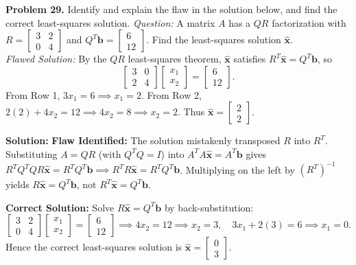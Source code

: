 \documentclass[11pt, letterpaper]{article}
\theoremstyle{definition}
\theoremstyle{remark}
\begin{document}
\textbf{Problem 29.} Identify and explain the flaw in the solution below, and find the correct least-squares solution.
\textit{Question:} A matrix $A$ has a $QR$ factorization with $R = \begin{bmatrix} 3 & 2 \\ 0 & 4 \end{bmatrix}$ and $Q^T \mathbf{b} = \begin{bmatrix} 6 \\ 12 \end{bmatrix}$. Find the least-squares solution $\hat{\mathbf{x}}$.\\
\textit{Flawed Solution:} By the $QR$ least-squares theorem, $\hat{\mathbf{x}}$ satisfies $R^T \hat{\mathbf{x}} = Q^T \mathbf{b}$, so
\[
\begin{bmatrix} 3 & 0 \\ 2 & 4 \end{bmatrix} \begin{bmatrix} x_1 \\ x_2 \end{bmatrix} = \begin{bmatrix} 6 \\ 12 \end{bmatrix}.
\]
From Row 1, $3x_1 = 6 \implies x_1 = 2$. From Row 2, $2(2) + 4x_2 = 12 \implies 4x_2 = 8 \implies x_2 = 2$. Thus $\hat{\mathbf{x}} = \begin{bmatrix} 2 \\ 2 \end{bmatrix}$.

\textbf{Solution:}
\textbf{Flaw Identified:} The solution mistakenly transposed $R$ into $R^T$. Substituting $A = QR$ (with $Q^T Q = I$) into $A^T A \hat{\mathbf{x}} = A^T \mathbf{b}$ gives $R^T Q^T Q R \hat{\mathbf{x}} = R^T Q^T \mathbf{b} \implies R^T R \hat{\mathbf{x}} = R^T Q^T \mathbf{b}$. Multiplying on the left by $(R^T)^{-1}$ yields $R\hat{\mathbf{x}} = Q^T \mathbf{b}$, not $R^T \hat{\mathbf{x}} = Q^T \mathbf{b}$.

\textbf{Correct Solution:} Solve $R\hat{\mathbf{x}} = Q^T \mathbf{b}$ by back-substitution:
\[
\begin{bmatrix} 3 & 2 \\ 0 & 4 \end{bmatrix} \begin{bmatrix} x_1 \\ x_2 \end{bmatrix} = \begin{bmatrix} 6 \\ 12 \end{bmatrix} \implies 4x_2 = 12 \implies x_2 = 3, \quad 3x_1 + 2(3) = 6 \implies x_1 = 0.
\]
Hence the correct least-squares solution is $\hat{\mathbf{x}} = \begin{bmatrix} 0 \\ 3 \end{bmatrix}$.
\end{document}
